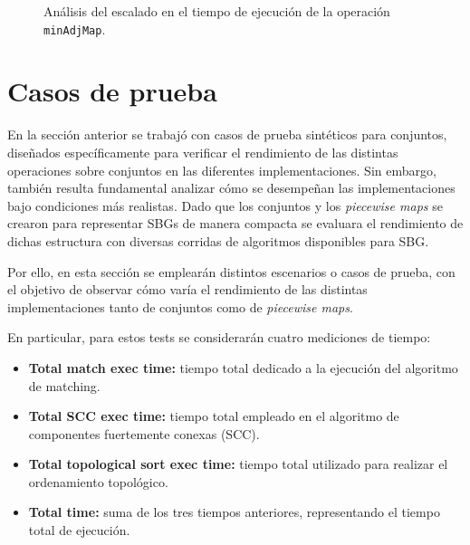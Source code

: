 \begin{itemize}
    \begin{figure}[htbp]
          \centering
          \caption{Análisis del escalado en el tiempo de ejecución de la operación \texttt{minAdjMap}.}
          \label{fig:min-esc}
    \end{figure}
\end{itemize}


\section{Casos de prueba}

En la sección anterior se trabajó con casos de prueba sintéticos para conjuntos, diseñados específicamente para verificar el rendimiento de las distintas operaciones sobre conjuntos en las diferentes implementaciones. Sin embargo, también resulta fundamental analizar cómo se desempeñan las implementaciones bajo condiciones más realistas. Dado que los conjuntos y los \textit{piecewise maps} se crearon para representar SBGs de manera compacta se evaluara el rendimiento de dichas estructura con diversas corridas de algoritmos disponibles para SBG.

Por ello, en esta sección se emplearán distintos escenarios o casos de prueba, con el objetivo de observar cómo varía el rendimiento de las distintas implementaciones tanto de conjuntos como de \textit{piecewise maps}.

En particular, para estos tests se considerarán cuatro mediciones de tiempo:

\begin{itemize}
    \item \textbf{Total match exec time:} tiempo total dedicado a la ejecución del algoritmo de matching.
    \item \textbf{Total SCC exec time:} tiempo total empleado en el algoritmo de componentes fuertemente conexas (SCC).
    \item \textbf{Total topological sort exec time:} tiempo total utilizado para realizar el ordenamiento topológico.
    \item \textbf{Total time:} suma de los tres tiempos anteriores, representando el tiempo total de ejecución.
\end{itemize}

